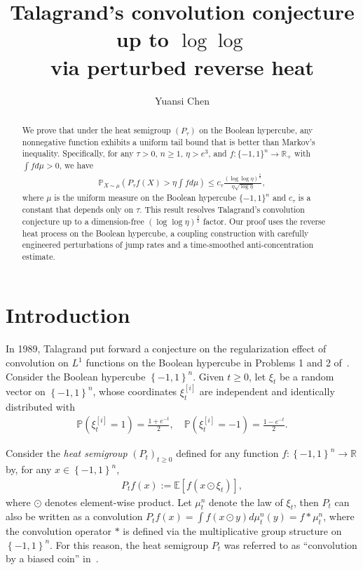 \documentclass[11pt]{article}
\title{Talagrand's convolution conjecture up to $\log \log$ \\ via perturbed reverse heat}
\author{Yuansi Chen}
\affil{ETH Z\"urich}
\date{}
\newcommand{\xii}{\xi^{[i]}}
\theoremstyle{named}
\theoremstyle{plain}
\newcommand{\defn}{:=}
\newcommand{\real}{\ensuremath{\mathbb{R}}}
\newcommand{\Exs}{\ensuremath{{\mathbb{E}}}}
\newcommand{\Prob}{\ensuremath{{\mathbb{P}}}}
\newcommand{\brackets}[1]{\left[ #1 \right]}
\newcommand{\braces}[1]{\left\{ #1 \right \}}
\begin{document}
\maketitle

\begin{abstract}
  We prove that under the heat semigroup $(P_\tau)$ on the Boolean hypercube, any nonnegative function exhibits a uniform tail bound that is better than Markov's inequality. Specifically, for any $\tau > 0$, $n \geq 1$, $\eta > e^3$, and $f: \{-1,1\}^n \to \mathbb{R}_+$ with $\int f d\mu > 0$, we have
  \begin{align*}
    \mathbb{P}_{X \sim \mu}\left( P_\tau f(X) > \eta \int f d\mu \right) \leq c_\tau \frac{ (\log \log \eta)^{\frac32} }{\eta \sqrt{\log \eta}},
  \end{align*}
  where $\mu$ is the uniform measure on the Boolean hypercube $\{-1,1\}^n$ and $c_\tau$ is a constant that depends only on $\tau$. This result resolves Talagrand's convolution conjecture up to a dimension-free $(\log \log \eta)^{\frac32}$ factor. Our proof uses the reverse heat process on the Boolean hypercube, a coupling construction with carefully engineered perturbations of jump rates and a time-smoothed anti-concentration estimate. 
\end{abstract}

\section{Introduction}
In 1989, Talagrand put forward a conjecture on the regularization effect of convolution on $L^1$ functions on the Boolean hypercube in Problems 1 and 2 of~\cite{talagrand1989conjecture}. Consider the Boolean hypercube $\braces{-1, 1}^n$. Given $t \geq 0$, let $\xi_t$ be a random vector on $\braces{-1, 1}^n$, whose coordinates $\xii_t$ are independent and identically distributed with
\begin{align*}
  \Prob(\xii_t = 1) = \frac{1+e^{-t}}{2}, \quad \Prob(\xii_t = -1) = \frac{1-e^{-t}}{2}.  
\end{align*}

Consider the \textit{heat semigroup} $(P_t)_{t \geq 0}$ defined for any function $f: \braces{-1, 1}^n \to \real$ by, for any $x \in \braces{-1,1}^n$,
\begin{align}
  \label{eq:heat_semigroup}
  P_t f(x) \defn \Exs\brackets{f(x \odot \xi_t)},
\end{align}
where $\odot$ denotes element-wise product. Let $\mu_t^n$ denote the law of $\xi_t$, then $P_t$ can also be written as a convolution $P_t f(x) = \int f(x \odot y) d\mu_t^n(y) = f \ast \mu_t^n$,
where the convolution operator $\ast$ is defined via the multiplicative group structure on $\braces{-1, 1}^n$. For this reason, the heat semigroup $P_t$ was referred to as ``convolution by a biased coin'' in~\cite{talagrand1989conjecture}. 
\end{document}
